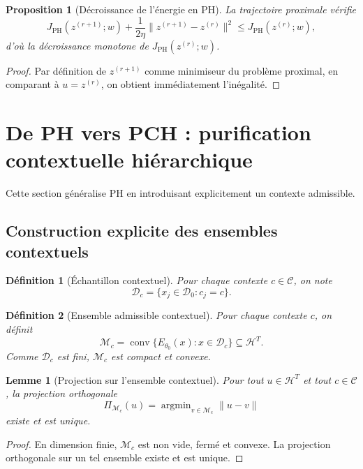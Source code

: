 \documentclass[11pt,a4paper]{article}
\newtheorem{definition}{Définition}[section]
\newtheorem{proposition}{Proposition}[section]
\newtheorem{lemma}{Lemme}[section]
\DeclareMathOperator{\argmin}{argmin}
\DeclareMathOperator{\conv}{conv}
\newcommand{\C}{\mathcal C}
\newcommand{\D}{\mathcal D}
\newcommand{\Hh}{\mathcal H}
\newcommand{\Mcal}{\mathcal M}
\newcommand{\1}{\mathbf 1}
\begin{document}
\begin{proposition}[Décroissance de l'énergie en PH]
La trajectoire proximale vérifie
\[
J_{\mathrm{PH}}(z^{(r+1)};w)
+
\frac{1}{2\eta}\|z^{(r+1)}-z^{(r)}\|^2
\le
J_{\mathrm{PH}}(z^{(r)};w),
\]
d'où la décroissance monotone de \(J_{\mathrm{PH}}(z^{(r)};w)\).
\end{proposition}

\begin{proof}
Par définition de \(z^{(r+1)}\) comme minimiseur du problème proximal, en comparant à \(u=z^{(r)}\), on obtient immédiatement l'inégalité.
\end{proof}

\section{De PH vers PCH : purification contextuelle hiérarchique}

Cette section généralise PH en introduisant explicitement un contexte admissible.

\subsection{Construction explicite des ensembles contextuels}

\begin{definition}[Échantillon contextuel]
Pour chaque contexte \(c\in\C\), on note
\[
\D_c=\{x_j\in\D_0 : c_j=c\}.
\]
\end{definition}

\begin{definition}[Ensemble admissible contextuel]
Pour chaque contexte \(c\), on définit
\[
\Mcal_c
=
\conv\{E_{\theta_0}(x): x\in\D_c\}\subseteq \Hh^T.
\]
Comme \(\D_c\) est fini, \(\Mcal_c\) est compact et convexe.
\end{definition}

\begin{lemma}[Projection sur l'ensemble contextuel]
Pour tout \(u\in\Hh^T\) et tout \(c\in\C\), la projection orthogonale
\[
\Pi_{\Mcal_c}(u)=\argmin_{v\in\Mcal_c}\|u-v\|
\]
existe et est unique.
\end{lemma}

\begin{proof}
En dimension finie, \(\Mcal_c\) est non vide, fermé et convexe.  
La projection orthogonale sur un tel ensemble existe et est unique.
\end{proof}
\end{document}
